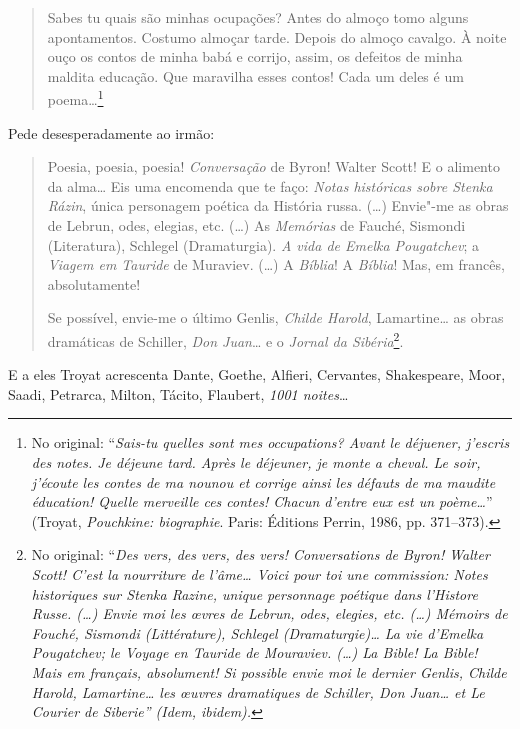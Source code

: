 \begin{quote}
Sabes tu quais são minhas ocupações? Antes do almoço tomo alguns
apontamentos. Costumo almoçar tarde. Depois do almoço cavalgo. À noite
ouço os contos de minha babá e corrijo, assim, os defeitos de minha
maldita educação. Que maravilha esses contos! Cada um deles é um
poema\ldots{}\footnote{No original: ``\emph{Sais-tu quelles sont mes
  occupations? Avant le déjuener, j'escris des notes. Je déjeune tard.
  Après le déjeuner, je monte a cheval. Le soir, j'écoute les contes de
  ma nounou et corrige ainsi les défauts de ma maudite éducation! Quelle
  merveille ces contes! Chacun d'entre eux est un poème\ldots{}}'' (Troyat, \emph{Pouchkine: biographie}. Paris: Éditions Perrin, 1986, pp. 371--373).}
\end{quote}


Pede desesperadamente ao irmão:

\begin{quote}
Poesia, poesia, poesia! \emph{Conversação} de Byron! Walter Scott! E o
alimento da alma\ldots{} Eis uma encomenda que te faço: \emph{Notas históricas
sobre Stenka Rázin}, única personagem poética da História russa. (\ldots{})
Envie"-me as obras de Lebrun, odes, elegias, etc. (\ldots{}) As
\emph{Memórias} de Fauché, Sismondi (Literatura), Schlegel (Dramaturgia).
\emph{A vida de Emelka Pougatchev}; a \emph{Viagem em Tauride} de
Muraviev. (\ldots{}) A \emph{Bíblia}! A \emph{Bíblia}! Mas, em francês,
absolutamente!

Se possível, envie-me o último Genlis, \emph{Childe Harold},
Lamartine\ldots{} as obras dramáticas de Schiller, \emph{Don Juan}\ldots{} e o
\emph{Jornal da Sibéria}\footnote{No original: ``\emph{Des vers, des vers,
  des vers! \emph{Conversations} de Byron! Walter Scott! C'est la nourriture de
  l'âme\ldots{} Voici pour toi une commission: \emph{Notes historiques sur
    Stenka Razine}, unique personnage poétique dans l'Histore
  Russe. (\ldots{}) Envie moi les œvres de Lebrun, odes, elegies,
  etc. (\ldots{}) \emph{Mémoirs} de Fouché, Sismondi (Littérature), Schlegel (Dramaturgie)\ldots{} \emph{La vie d'Emelka Pougatchev}; le \emph{Voyage en Tauride} de Mouraviev. (\ldots{}) La \emph{Bible}! La \emph{Bible}! Mais em
  français, absolument! Si possible envie moi le dernier Genlis, \emph{Childe Harold}, Lamartine\ldots{} les œuvres dramatiques de Schiller, \emph{Don Juan}\ldots{} et \emph{Le Courier de Siberie}'' (Idem, ibidem).}}.
\end{quote}

E a eles Troyat acrescenta Dante, Goethe, Alfieri, Cervantes,
Shakespeare, Moor, Saadi, Petrarca, Milton, Tácito, Flaubert, \emph{1001
noites}\ldots{}

